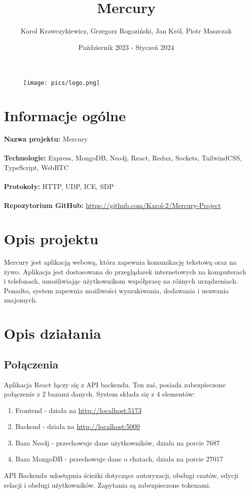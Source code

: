 \documentclass{article}
\title{Mercury}
\author{Karol Krawczykiewicz, Grzegorz Rogoziński, Jan Król, Piotr Maszczak}
\date{Październik 2023 - Styczeń 2024}
\begin{document}
\begin{figure}
    \centering
    \texttt{[image: pics/logo.png]}
\end{figure}

\maketitle
\section{Informacje ogólne}
\textbf{Nazwa projektu:} Mercury
\\
\\
\textbf{Technologie:} Express, MongoDB, Neo4j, React, Redux, Sockets, TailwindCSS, TypeScript, WebRTC
\\
\\
\textbf{Protokoły:} HTTP, UDP, ICE, SDP
\\
\\
\textbf{Repozytorium GitHub:}
\url{https://github.com/Karol-2/Mercury-Project}

\section{Opis projektu}
Mercury jest aplikacją webową, która zapewnia komunikację tekstową oraz na żywo. Aplikacja jest dostosowana do przeglądarek internetowych na komputerach i telefonach, umożliwiając użytkownikom współpracę na różnych urządzeniach. Ponadto, system zapewnia możliwości wyszukiwania, dodawania i usuwania znajomych.


\newpage
\section{Opis działania}
\subsection{Połączenia}

Aplikacja React łączy się z API backendu. Ten zaś, posiada zabezpieczone połączenie z 2 bazami danych. System składa się z 4 elementów:
\begin{enumerate}
  \item Frontend - działa na \url{http://localhost:5173}
  \item Backend - działa na \url{http://localhost:5000}
  \item Baza Neo4j - przechowuje dane użytkowników, działa na porcie 7687
  \item Baza MongoDB - przechowuje dane o chatach,  działa na porcie 27017
\end{enumerate}
API Backendu udostępnia ścieżki dotyczące autoryzacji, obsługi czatów, edycji relacji i obsługi użytkowników. Zapytania są zabezpieczone tokenami.
\end{document}
